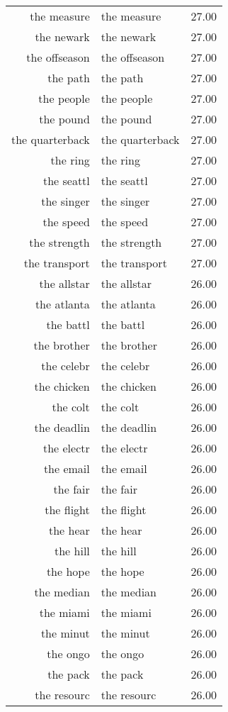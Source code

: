 \begin{table}[ht]
\begin{tabular}{rlr}
  the measure & the measure & 27.00 \\ 
  the newark & the newark & 27.00 \\ 
  the offseason & the offseason & 27.00 \\ 
  the path & the path & 27.00 \\ 
  the people & the people & 27.00 \\ 
  the pound & the pound & 27.00 \\ 
  the quarterback & the quarterback & 27.00 \\ 
  the ring & the ring & 27.00 \\ 
  the seattl & the seattl & 27.00 \\ 
  the singer & the singer & 27.00 \\ 
  the speed & the speed & 27.00 \\ 
  the strength & the strength & 27.00 \\ 
  the transport & the transport & 27.00 \\ 
  the allstar & the allstar & 26.00 \\ 
  the atlanta & the atlanta & 26.00 \\ 
  the battl & the battl & 26.00 \\ 
  the brother & the brother & 26.00 \\ 
  the celebr & the celebr & 26.00 \\ 
  the chicken & the chicken & 26.00 \\ 
  the colt & the colt & 26.00 \\ 
  the deadlin & the deadlin & 26.00 \\ 
  the electr & the electr & 26.00 \\ 
  the email & the email & 26.00 \\ 
  the fair & the fair & 26.00 \\ 
  the flight & the flight & 26.00 \\ 
  the hear & the hear & 26.00 \\ 
  the hill & the hill & 26.00 \\ 
  the hope & the hope & 26.00 \\ 
  the median & the median & 26.00 \\ 
  the miami & the miami & 26.00 \\ 
  the minut & the minut & 26.00 \\ 
  the ongo & the ongo & 26.00 \\ 
  the pack & the pack & 26.00 \\ 
  the resourc & the resourc & 26.00 \\ 

\end{tabular}
\end{table}
